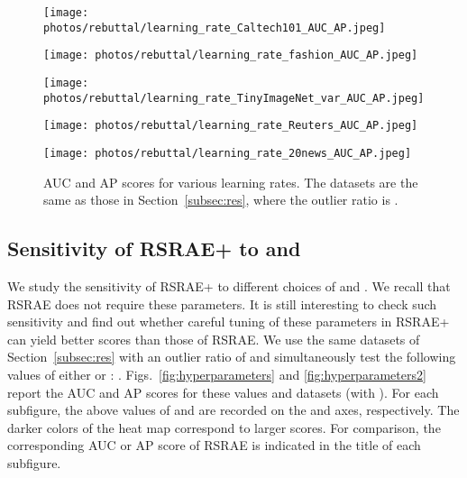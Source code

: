 \documentclass{article} \usepackage{iclr2020_conference,times}
\def\Secref#1{Section~\ref{#1}}
\begin{document}
\begin{figure}[htbp]
\centering
\begin{minipage}[t]{0.48\textwidth}
\centering
\texttt{[image: photos/rebuttal/learning\_rate\_Caltech101\_AUC\_AP.jpeg]}
\end{minipage}
\begin{minipage}[t]{0.48\textwidth}
\centering
\texttt{[image: photos/rebuttal/learning\_rate\_fashion\_AUC\_AP.jpeg]}
\end{minipage}

\centering
\begin{minipage}[t]{0.48\textwidth}

\centering
\texttt{[image: photos/rebuttal/learning\_rate\_TinyImageNet\_var\_AUC\_AP.jpeg]}
\end{minipage}
\begin{minipage}[t]{0.48\textwidth}
\centering
\texttt{[image: photos/rebuttal/learning\_rate\_Reuters\_AUC\_AP.jpeg]}
\end{minipage}


 
\centering
\begin{minipage}[t]{0.48\textwidth}
\centering
\texttt{[image: photos/rebuttal/learning\_rate\_20news\_AUC\_AP.jpeg]}
\end{minipage}


\caption{AUC and AP scores for various learning rates.  The datasets are the same as those in \Secref{subsec:res}, where the outlier ratio is .}
\label{fig:learningrate}

\end{figure}


\subsection{Sensitivity of RSRAE+ to  and }
\label{subsec:hyperparameters}


We study the sensitivity of RSRAE+ to different choices of  and . We recall that RSRAE does not require these parameters. It is still interesting to check such sensitivity and find out whether careful tuning of these parameters in RSRAE+ can yield better scores than those of RSRAE. We use the same datasets of \Secref{subsec:res} with an outlier ratio of  and simultaneously test the following values of either  or  : . Figs.~\ref{fig:hyperparameters} and \ref{fig:hyperparameters2} report the AUC and AP scores for these values and datasets (with ). 
For each subfigure, the above values of  and  are recorded on the  and  axes, respectively. The darker colors of the heat map correspond to larger scores. For comparison, the corresponding AUC or AP score of RSRAE is indicated in the title of each subfigure. 
\end{document}
